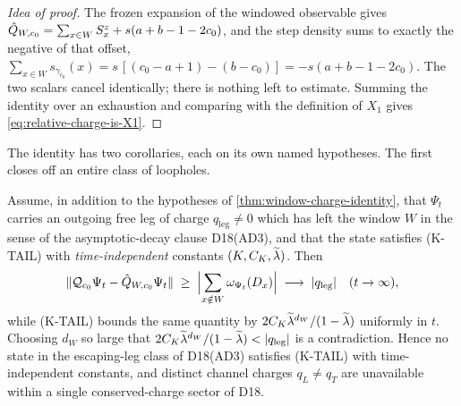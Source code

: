 \begin{proof}[Idea of proof]
The frozen expansion of the windowed observable gives
$\hat{Q}_{W,c_0}=\sum_{x\in W}S^z_x+s(a+b-1-2c_0)$, and the step density sums to
exactly the negative of that offset,
$\sum_{x\in W}s_{\gamma_{c_0}}(x)=s\,[(c_0-a+1)-(b-c_0)]=-s(a+b-1-2c_0)$. The
two scalars cancel identically; there is nothing left to estimate. Summing the
identity over an exhaustion and comparing with the definition of $X_1$ gives
\eqref{eq:relative-charge-is-X1}.
\end{proof}


The identity has two corollaries, each on its own named hypotheses. The first
closes off an entire class of loopholes.

\begin{corollary}
\label{cor:no-escaping-leg}
\statusProvedConditional\;
Assume, in addition to the hypotheses of \cref{thm:window-charge-identity},
that $\Psi_t$ carries an outgoing free leg of charge $q_{\mathrm{leg}}\neq0$
which has left the window $W$ in the sense of the asymptotic-decay clause
D18(AD3), and that the state satisfies (K-TAIL) with \emph{time-independent}
constants $(K,C_K,\widetilde{\lambda})$. Then
\begin{equation}
  \lVert \mathcal{Q}_{c_0}\Psi_t-\hat{Q}_{W,c_0}\Psi_t\rVert
  \;\ge\;\Bigl|\sum_{x\notin W}\omega_{\Psi_t}(D_x)\Bigr|
  \;\longrightarrow\;\lvert q_{\mathrm{leg}}\rvert
  \quad(t\to\infty),
  \label{eq:leg-lower-bound}
\end{equation}
while (K-TAIL) bounds the same quantity by $2C_K\widetilde{\lambda}^{d_W}/(1-\widetilde{\lambda})$
uniformly in $t$. Choosing $d_W$ so large that
$2C_K\widetilde{\lambda}^{d_W}/(1-\widetilde{\lambda})<\lvert q_{\mathrm{leg}}\rvert$ is a contradiction. Hence
no state in the escaping-leg class of D18(AD3) satisfies (K-TAIL) with
time-independent constants, and distinct channel charges $q_L\neq q_T$ are
unavailable within a single conserved-charge sector of D18.
\end{corollary}

